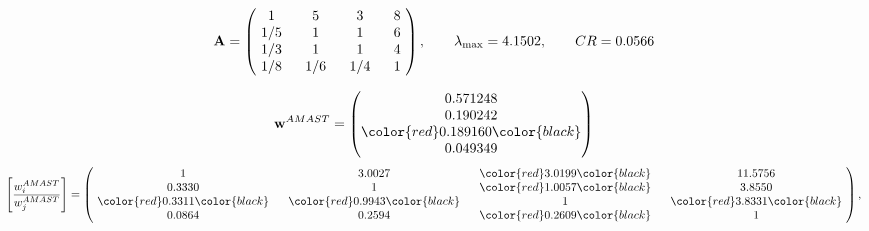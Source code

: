 \begin{example}
\begin{equation*}
\mathbf{A} =
\begin{pmatrix}
$\,\,$ 1 $\,\,$ & $\,\,$5$\,\,$ & $\,\,$3$\,\,$ & $\,\,$8 $\,\,$ \\
$\,\,$ 1/5$\,\,$ & $\,\,$ 1 $\,\,$ & $\,\,$1$\,\,$ & $\,\,$6 $\,\,$ \\
$\,\,$ 1/3$\,\,$ & $\,\,$ 1 $\,\,$ & $\,\,$ 1 $\,\,$ & $\,\,$4 $\,\,$ \\
$\,\,$ 1/8$\,\,$ & $\,\,$ 1/6$\,\,$ & $\,\,$ 1/4$\,\,$ & $\,\,$ 1  $\,\,$ \\
\end{pmatrix},
\qquad
\lambda_{\max} =
4.1502,
\qquad
CR = 0.0566
\end{equation*}

\begin{equation*}
\mathbf{w}^{AMAST} =
\begin{pmatrix}
0.571248\\
0.190242\\
\color{red} 0.189160\color{black} \\
0.049349
\end{pmatrix}\end{equation*}
\begin{equation*}
\left[ \frac{{w}^{AMAST}_i}{{w}^{AMAST}_j} \right] =
\begin{pmatrix}
$\,\,$ 1 $\,\,$ & $\,\,$3.0027$\,\,$ & $\,\,$\color{red} 3.0199\color{black} $\,\,$ & $\,\,$11.5756$\,\,$ \\
$\,\,$0.3330$\,\,$ & $\,\,$ 1 $\,\,$ & $\,\,$\color{red} 1.0057\color{black} $\,\,$ & $\,\,$3.8550  $\,\,$ \\
$\,\,$\color{red} 0.3311\color{black} $\,\,$ & $\,\,$\color{red} 0.9943\color{black} $\,\,$ & $\,\,$ 1 $\,\,$ & $\,\,$\color{red} 3.8331\color{black}  $\,\,$ \\
$\,\,$0.0864$\,\,$ & $\,\,$0.2594$\,\,$ & $\,\,$\color{red} 0.2609\color{black} $\,\,$ & $\,\,$ 1  $\,\,$ \\
\end{pmatrix},
\end{equation*}


\end{example}
